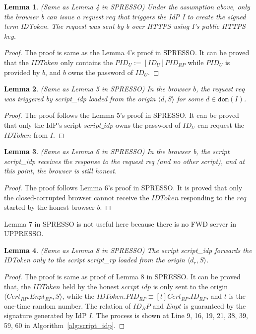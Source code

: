 \documentclass[letterpaper,onecolumn,10pt]{article}
\newtheorem{lemma}{Lemma}
\begin{document}
\begin{lemma}
(Same as Lemma 4 in SPRESSO) Under the assumption above, only the browser b can issue a request $req$ that triggers the IdP I to create the signed term IDToken. The request was sent by b over HTTPS using I's public HTTPS key.
\end{lemma}
\begin{proof}
The proof is same as the Lemma 4's proof in SPRESSO.
It can be proved that the $IDToken$ only contains the $PID_U:=[ID_U]PID_{RP}$ while $PID_U$ is provided by $b$, and $b$ owns the password of $ID_U$.
\end{proof}

\begin{lemma}
(Same as Lemma 5 in SPRESSO) In the browser $b$, the request $req$ was triggered by script\_idp loaded from the origin $\langle d, S \rangle$ for some $d \in \mathtt{dom}(I)$.
\end{lemma}
\begin{proof}
The proof follows the Lemma 5's proof in SPRESSO.
It can be proved that only the IdP's script $script\_idp$ owns the password of $ID_U$ can request the $IDToken$ from $I$.
\end{proof}

\begin{lemma}
(Same as Lemma 6 in SPRESSO) In the browser b, the script script\_idp receives the response to the request req (and no other script), and at this point, the browser is still honest.
\end{lemma}
\begin{proof}
The proof follows Lemma 6's proof in SPRESSO.
It is proved that only the closed-corrupted browser cannot receive the $IDToken$ responding to the $req$ started by the honest browser $b$.
\end{proof}

Lemma 7 in SPRESSO is not useful here because there is no FWD server in UPPRESSO.

\begin{lemma}
(Same as Lemma 8 in SPRESSO) The script script\_idp forwards the IDToken only to the script script\_rp loaded from the origin $\langle d_r, S \rangle$.
\end{lemma}
\begin{proof}
The proof is same as proof of Lemma 8 in SPRESSO.
It can be proved that, the $IDToken$ held by the honest $script\_idp$ is only sent to the origin $\langle Cert_{RP}.Enpt_{RP}, S \rangle$, while the $IDToken.PID_{RP} \equiv [t]Cert_{RP}.ID_{RP}$, and $t$ is the one-time random number.  The relation of $ID_RP$ and $Enpt$ is guaranteed by the signature generated by IdP $I$. The process is shown at Line 9, 16, 19, 21, 38, 39, 59, 60  in Algorithm~\ref{alg:script_idp}.
\end{proof}
\end{document}
